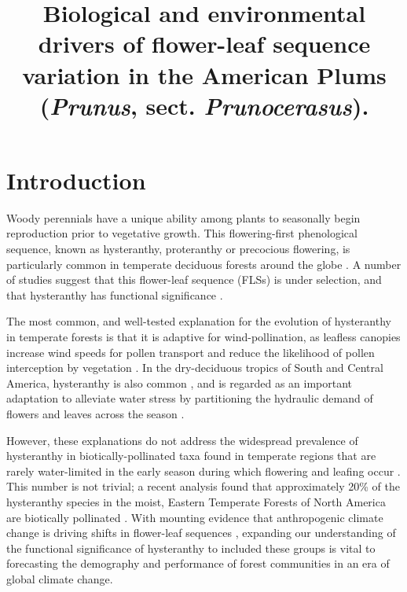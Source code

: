 \documentclass{article}[11pt]
\title{Biological and environmental drivers of flower-leaf sequence variation in the American Plums (\emph{Prunus}, sect. \emph{Prunocerasus}). }
\begin{document}

\maketitle


\section*{Introduction}
\noindent Woody perennials have a unique ability among plants to seasonally begin reproduction prior to vegetative growth. This flowering-first phenological sequence, known as hysteranthy, proteranthy or precocious flowering, is particularly common in temperate deciduous forests around the globe \citep{Rathcke_1985}. A number of studies suggest that this flower-leaf sequence (FLSs) is under selection, and that hysteranthy has functional significance \citep{Gougherty2018,Buonaiuto2020,Guo2014}.

\noindent The most common, and well-tested explanation for the evolution of hysteranthy in temperate forests is that it is adaptive for wind-pollination, as leafless canopies increase wind speeds for pollen transport and reduce the likelihood of pollen interception by vegetation \citep{Whitehead1969,Niklas1985}. In the dry-deciduous tropics of South and Central America, hysteranthy is also common \citep{Rathcke_1985,Franklin2016}, and is regarded as an important adaptation to alleviate water stress by partitioning the hydraulic demand of flowers and leaves across the season \citep{Gougherty2018,Franklin2016,Borchert1983,Reich1984}.

However, these explanations do not address the widespread prevalence of hysteranthy in biotically-pollinated taxa found in temperate regions that are rarely water-limited in the early season during which flowering and leafing occur \citep{Polgar2011}. This number is not trivial; a recent analysis found that approximately 20\% of the hysteranthy species in the moist, Eastern Temperate Forests of North America are biotically pollinated \citep{Buonaiuto2020}. With mounting evidence that anthropogenic climate change is driving shifts in flower-leaf sequences \citep{Ma2020:aa}, expanding our understanding of the functional significance of hysteranthy to included these groups is vital to forecasting the demography and performance of forest communities in an era of global climate change.
\end{document}
